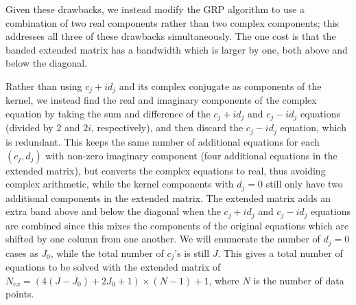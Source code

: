 \documentclass[manuscript, letterpaper]{aastex6}
\begin{document}
Given these drawbacks, we instead modify the GRP algorithm to use a combination of two real
components rather than two complex components;  this addresses all three of these drawbacks
simultaneously.  The one cost is that the banded extended matrix has a bandwidth which is
larger by one, both above and below the diagonal.

Rather than using $c_j+id_j$ and its complex conjugate as components of the kernel, we instead
find the real and imaginary components of the complex equation by taking the
sum and difference of the $c_j+id_j$ and $c_j-id_j$ equations (divided by 2 and $2i$, respectively),
and then discard the $c_j-id_j$ equation, which is redundant.  This keeps the same number of
additional equations for each $(c_j,d_j)$ with non-zero imaginary component (four additional
equations in the extended matrix), but converts the complex equations to real, thus avoiding
complex arithmetic, while the kernel components with $d_j=0$ still only have two
additional components in the extended matrix.  The extended matrix adds an extra band above
and below the diagonal when the $c_j+id_j$ and $c_j-id_j$ equations are combined since this
mixes the components of the original equations which are shifted by one column from one
another.  We will enumerate the number of $d_j=0$ cases as $J_0$, while the total number
of $c_j$'s is still $J$.  This gives a total number of equations to be solved with the
extended matrix of $N_{ex}= (4(J-J_0)+2J_0+1)\times(N-1)+1$, where $N$ is the number of data
points.

\end{document}
